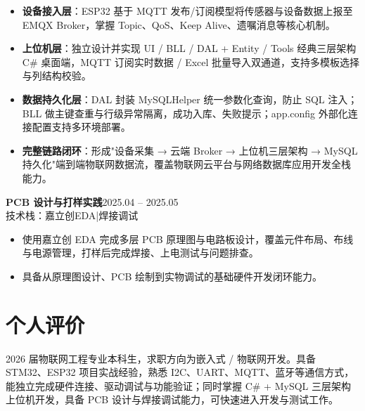 \documentclass[10pt,a4paper]{article}
\newcommand{\projectblock}[3]{%
    {\bfseries\color{darktext}#1}\hfill{\color{graytext}#2}\\%
    {\small\color{graytext}#3}%
    \vspace{0.2em}%
}
\begin{document}
\begin{itemize}[leftmargin=1.5em, itemsep=2pt, parsep=0pt, topsep=2pt]
    \item \textbf{设备接入层}：ESP32 基于 MQTT 发布/订阅模型将传感器与设备数据上报至 EMQX Broker，掌握 Topic、QoS、Keep Alive、遗嘱消息等核心机制。
    \item \textbf{上位机层}：独立设计并实现 UI / BLL / DAL + Entity / Tools 经典三层架构 C\# 桌面端，MQTT 订阅实时数据 / Excel 批量导入双通道，支持多模板选择与列结构校验。
    \item \textbf{数据持久化层}：DAL 封装 MySQLHelper 统一参数化查询，防止 SQL 注入；BLL 做主键查重与行级异常隔离，成功入库、失败提示；app.config 外部化连接配置支持多环境部署。
    \item \textbf{完整链路闭环}：形成"设备采集 → 云端 Broker → 上位机三层架构 → MySQL 持久化"端到端物联网数据流，覆盖物联网云平台与网络数据库应用开发全栈能力。
\end{itemize}

\vspace{0.15em}

\projectblock{PCB 设计与打样实践}{2025.04 -- 2025.05}{技术栈：嘉立创EDA\hspace{0.3em}|\hspace{0.3em}焊接调试}

\begin{itemize}[leftmargin=1.5em, itemsep=2pt, parsep=0pt, topsep=2pt]
    \item 使用嘉立创 EDA 完成多层 PCB 原理图与电路板设计，覆盖元件布局、布线与电源管理，打样后完成焊接、上电测试与问题排查。
    \item 具备从原理图设计、PCB 绘制到实物调试的基础硬件开发闭环能力。
\end{itemize}

\vspace{0.15em}

\section{\faUser\hspace{0.4em}个人评价}

2026 届物联网工程专业本科生，求职方向为嵌入式 / 物联网开发。具备 STM32、ESP32 项目实战经验，熟悉 I2C、UART、MQTT、蓝牙等通信方式，能独立完成硬件连接、驱动调试与功能验证；同时掌握 C\# + MySQL 三层架构上位机开发，具备 PCB 设计与焊接调试能力，可快速进入开发与测试工作。

\vspace{0.15em}
\end{document}
